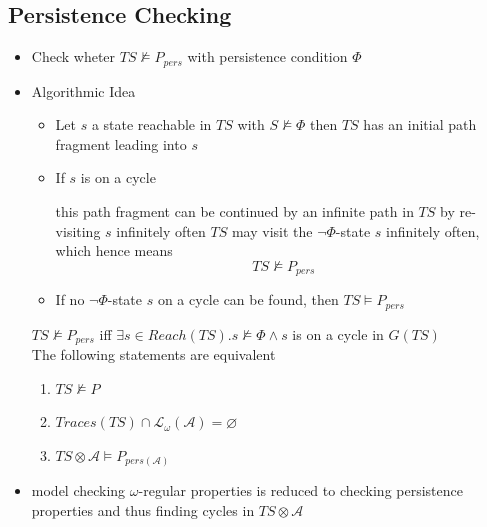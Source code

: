 \documentclass[a4paper, 10pt]{article}
\begin{document}
\subsection*{Persistence Checking}
\begin{itemize}
    \item Check wheter $TS\not\models P_{pers}$ with persistence condition $\Phi$
    \item Algorithmic Idea
    \begin{itemize}
        \item Let $s$ a state reachable in $TS$ with $S\not\models\Phi$ \follows then $TS$ has an initial path fragment leading into $s$
        \item If $s$ is on a cycle
        \begin{itemize}
            \fitem this path fragment can be continued by an infinite path in $TS$ by re-visiting $s$ infinitely often
            \fitem $TS$ may visit the $\neg\Phi$-state $s$ infinitely often, which hence means \[ TS\not\models P_{pers} \]
        \end{itemize}
        \item If no $\neg\Phi$-state $s$ on a cycle can be found, then $TS\models P_{pers}$
    \end{itemize}
    \begin{shaded}
        $TS\not\models P_{pers}$ iff $\exists s\in Reach(TS).s\not\models\Phi\wedge s$ is on a cycle in $G(TS)$
        \\ The following statements are equivalent
        \begin{enumerate}
            \item $TS\not\models P$
            \item $Traces(TS)\cap \mathcal{L}_\omega(\mathcal{A})=\varnothing$
            \item $TS\otimes \mathcal{A}\models P_{pers(\mathcal{A})}$
        \end{enumerate}
    \end{shaded}
    \item model checking $\omega$-regular properties is reduced to checking persistence properties and thus finding cycles in $TS\otimes \mathcal{A}$
\end{itemize}
\end{document}
